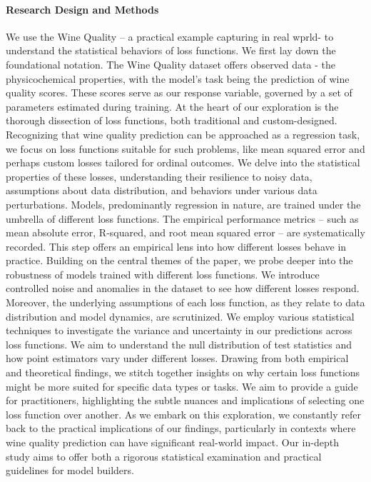 \documentclass[12pt]{article}
\begin{document}
\paragraph{Research Design and Methods}
We use the Wine Quality – a practical example capturing in real wprld- to understand the statistical behaviors of loss functions. We first lay down the foundational notation. The Wine Quality dataset offers observed data - the physicochemical properties, with the model's task being the prediction of wine quality scores. These scores serve as our response variable, governed by a set of parameters estimated during training. At the heart of our exploration is the thorough dissection of loss functions, both traditional and custom-designed. Recognizing that wine quality prediction can be approached as a regression task, we focus on loss functions suitable for such problems, like mean squared error and perhaps custom losses tailored for ordinal outcomes. We delve into the statistical properties of these losses, understanding their resilience to noisy data, assumptions about data distribution, and behaviors under various data perturbations. Models, predominantly regression in nature, are trained under the umbrella of different loss functions. The empirical performance metrics – such as mean absolute error, R-squared, and root mean squared error – are systematically recorded. This step offers an empirical lens into how different losses behave in practice. Building on the central themes of the paper, we probe deeper into the robustness of models trained with different loss functions. We introduce controlled noise and anomalies in the dataset to see how different losses respond. Moreover, the underlying assumptions of each loss function, as they relate to data distribution and model dynamics, are scrutinized. We employ various statistical techniques to investigate the variance and uncertainty in our predictions across loss functions. We aim to understand the null distribution of test statistics and how point estimators vary under different losses. Drawing from both empirical and theoretical findings, we stitch together insights on why certain loss functions might be more suited for specific data types or tasks. We aim to provide a guide for practitioners, highlighting the subtle nuances and implications of selecting one loss function over another. As we embark on this exploration, we constantly refer back to the practical implications of our findings, particularly in contexts where wine quality prediction can have significant real-world impact. Our in-depth study aims to offer both a rigorous statistical examination and practical guidelines for model builders. 
\end{document}
